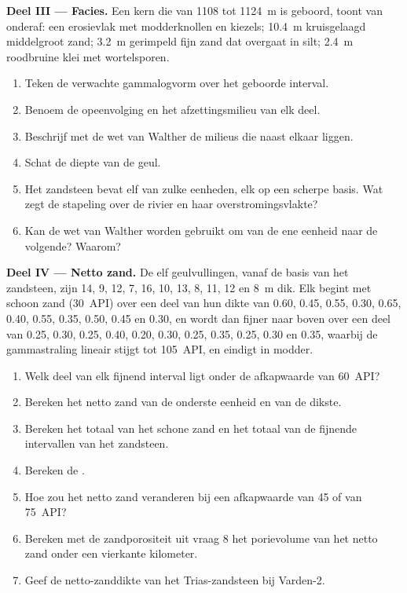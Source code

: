 \begin{problem}
\medskip\noindent\textbf{Deel III --- Facies.} Een kern die van 1108 tot
\qty{1124}{m} is geboord, toont van onderaf: een erosievlak met modderknollen en
kiezels; \qty{10.4}{m} kruisgelaagd middelgroot zand; \qty{3.2}{m} gerimpeld
fijn zand dat overgaat in silt; \qty{2.4}{m} roodbruine klei met wortelsporen.
\begin{enumerate}[resume]
\item Teken de verwachte gammalogvorm over het geboorde interval.
\item Benoem de opeenvolging en het afzettingsmilieu van elk deel.
\item Beschrijf met de wet van Walther de milieus die naast elkaar liggen.
\item Schat de diepte van de geul.
\item Het zandsteen bevat elf van zulke eenheden, elk op een scherpe basis. Wat zegt
  de stapeling over de rivier en haar overstromingsvlakte?
\item Kan de wet van Walther worden gebruikt om van de ene eenheid naar de volgende? Waarom?
\end{enumerate}

\medskip\noindent\textbf{Deel IV --- Netto zand.} De elf geulvullingen,
vanaf de basis van het zandsteen, zijn 14, 9, 12, 7, 16, 10, 13, 8, 11, 12 en
\qty{8}{m} dik. Elk begint met schoon zand (\qty{30}{API}) over een deel
van hun dikte van 0.60, 0.45, 0.55, 0.30, 0.65, 0.40, 0.55, 0.35, 0.50,
0.45 en 0.30, en wordt dan fijner naar boven over een deel van 0.25, 0.30, 0.25, 0.40,
0.20, 0.30, 0.25, 0.35, 0.25, 0.30 en 0.35, waarbij de gammastraling lineair stijgt tot
\qty{105}{API}, en eindigt in modder.
\begin{enumerate}[resume]
\item Welk deel van elk fijnend interval ligt onder de
  afkapwaarde van \qty{60}{API}?
\item Bereken het netto zand van de onderste eenheid en van de dikste.
\item Bereken het totaal van het schone zand en het totaal van de fijnende intervallen van het
  zandsteen.
\item Bereken de .
\item Hoe zou het netto zand veranderen bij een afkapwaarde van 45 of van
  \qty{75}{API}?
\item Bereken met de zandporositeit uit vraag 8 het porievolume van het
  netto zand onder een vierkante kilometer.
\item Geef de netto-zanddikte van het Trias-zandsteen bij Varden-2.
\end{enumerate}
\end{problem}
